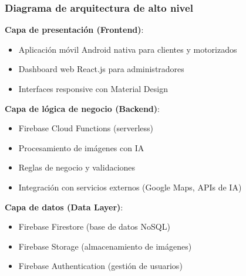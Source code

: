 \subsubsection{Diagrama de arquitectura de alto nivel}

\textbf{Capa de presentación (Frontend)}:
\begin{itemize}
    \item Aplicación móvil Android nativa para clientes y motorizados
    \item Dashboard web React.js para administradores
    \item Interfaces responsive con Material Design
\end{itemize}

\textbf{Capa de lógica de negocio (Backend)}:
\begin{itemize}
    \item Firebase Cloud Functions (serverless)
    \item Procesamiento de imágenes con IA
    \item Reglas de negocio y validaciones
    \item Integración con servicios externos (Google Maps, APIs de IA)
\end{itemize}

\textbf{Capa de datos (Data Layer)}:
\begin{itemize}
    \item Firebase Firestore (base de datos NoSQL)
    \item Firebase Storage (almacenamiento de imágenes)
    \item Firebase Authentication (gestión de usuarios)
\end{itemize}

